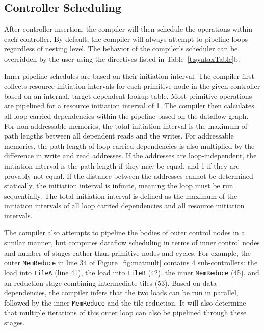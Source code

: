 {%


\subsection{Controller Scheduling}
\label{scheduling}
After controller insertion, the compiler will then schedule the operations within each controller.
By default, the compiler will always attempt to pipeline loops regardless of nesting level. 
The behavior of the compiler's scheduler can be overridden by the user using the directives listed in Table~\ref{t:syntaxTable}b.

Inner pipeline schedules are based on their initiation interval. 
The compiler first collects resource initiation intervals for each primitive node in the given controller based on an internal, target-dependent lookup table.
Most primitive operations are pipelined for a resource initiation interval of 1. 
The compiler then calculates all loop carried dependencies within the pipeline based on the dataflow graph.
For non-addressable memories, the total initiation interval is the maximum of path lengths between all dependent reads and the writes. 
For addressable memories, the path length of loop carried dependencies is also multiplied by the difference in write and read addresses.  
If the addresses are loop-independent, the initiation interval is the path length if they may be equal, and 1 if they are provably not equal. If the distance between the addresses cannot be determined statically, the initiation interval is infinite, meaning the loop must be run sequentially.
The total initiation interval is defined as the maximum of the initiation intervals of all loop carried dependencies and all resource initiation intervals. 

The compiler also attempts to pipeline the bodies of outer control nodes in a similar manner, but computes dataflow scheduling in terms of inner control nodes and number of stages rather than primitive nodes and cycles. For example, the outer \texttt{\small{MemReduce}} in line 34 of Figure~\ref{fig:matmult} contains 4 sub-controllers: the load into \texttt{\small{tileA}} (line 41), the load into \texttt{\small{tileB}} (42), the inner \texttt{\small{MemReduce}} (45), and an reduction stage combining intermediate tiles (53). Based on data dependencies, the compiler infers that the two loads can be run in parallel, followed by the inner \texttt{\small{MemReduce}} and the tile reduction. It will also determine that multiple iterations of this outer loop can also be pipelined through these stages.

}
